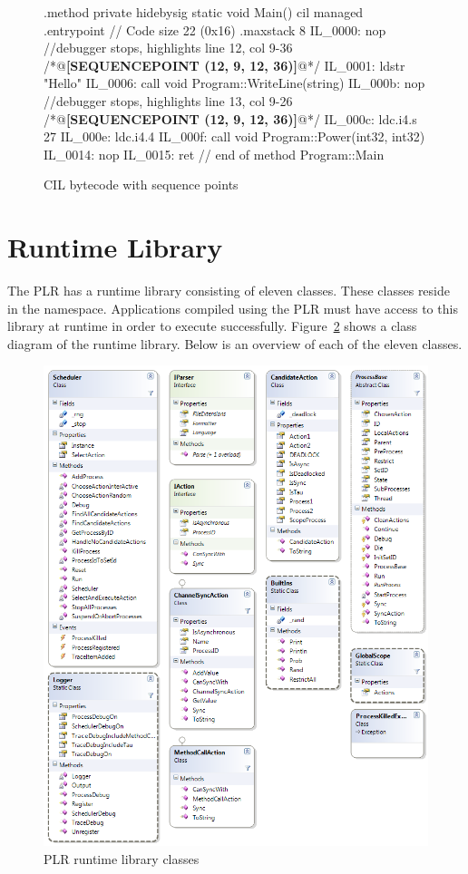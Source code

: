	\begin{figure}
	\begin{cil} 
.method private hidebysig static void  Main() cil managed
{
  .entrypoint
  // Code size       22 (0x16)
  .maxstack  8
  IL_0000:  nop
//debugger stops, highlights line 12, col 9-36
/*@\textbf{[SEQUENCEPOINT (12, 9, 12, 36)]}@*/
  IL_0001:  ldstr      "Hello"
  IL_0006:  call       void Program::WriteLine(string)
  IL_000b:  nop
//debugger stops, highlights line 13, col 9-26
/*@\textbf{[SEQUENCEPOINT (12, 9, 12, 36)]}@*/
  IL_000c:  ldc.i4.s   27
  IL_000e:  ldc.i4.4
  IL_000f:  call       void Program::Power(int32, int32)
  IL_0014:  nop
  IL_0015:  ret
} // end of method Program::Main
  \end{cil}
  \caption{CIL bytecode with sequence points}
  \label{fig:sequence_points}
	\end{figure}
	
\section{Runtime Library}

	The PLR has a runtime library consisting of eleven classes. These classes
	reside in the  namespace. Applications compiled using 
	the PLR must have access to this library at runtime in order to execute 
	successfully. Figure~\ref{fig:runtime_library} shows a class diagram of the 
	runtime library. Below is an overview of each of the eleven classes.

	\begin{figure}[ht!]
		\centering
		\includegraphics[scale=0.45]{RuntimeLibrary.png}
		\caption{PLR runtime library classes}
		\label{fig:runtime_library}
	\end{figure}

